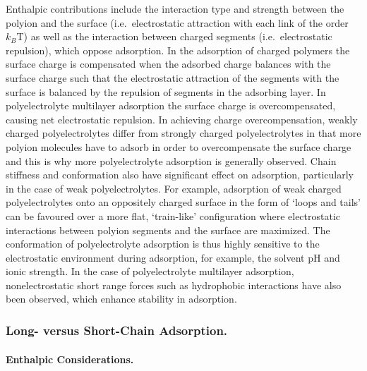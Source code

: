 \documentclass[twoside,twocolumn,9pt]{article}
\begin{document}
Enthalpic contributions include the interaction type and strength between the polyion and the surface (i.e.\ electrostatic attraction with each link of the order $k_B$T) as well as the interaction between charged segments (i.e.\ electrostatic repulsion), which oppose adsorption.\cite{Hoogeveen1996,VonGoeler1994}  In the adsorption of charged polymers the surface charge is compensated when the adsorbed charge balances with the surface charge such that the electrostatic attraction of the segments with the surface is balanced by the repulsion of segments in the adsorbing layer.  In polyelectrolyte multilayer adsorption the surface charge is overcompensated, causing net electrostatic repulsion.  In achieving charge overcompensation, weakly charged polyelectrolytes differ from strongly charged polyelectrolytes in that more polyion molecules have to adsorb in order to overcompensate the surface charge and this is why more polyelectrolyte adsorption is generally observed.  Chain stiffness and conformation also have significant effect on adsorption, particularly in the case of weak polyelectrolytes.\cite{Dzubiella2003}  For example, adsorption of weak charged polyelectrolytes onto an oppositely charged surface in the form of `loops and tails' can be favoured over a more flat, `train-like' configuration where electrostatic interactions between polyion segments and the surface are maximized. \cite{Borisov1994}  The conformation of polyelectrolyte adsorption is thus highly sensitive to the electrostatic environment during adsorption, for example, the solvent pH and ionic strength.\cite{Notley2004}  In the case of polyelectrolyte multilayer adsorption, nonelectrostatic short range forces such as hydrophobic interactions have also been observed, which enhance stability in adsorption.\cite{Kotov1999}  


\subsubsection{Long- versus Short-Chain Adsorption.}  %
  \label{sec-longvsshort}

\paragraph{Enthalpic Considerations.}  %
    \label{sec-enthalpic}
\end{document}
